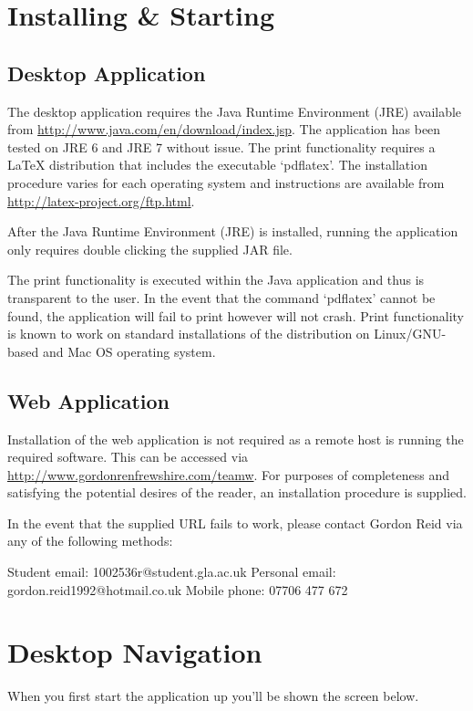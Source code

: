 \section{Installing \& Starting}
\subsection{Desktop Application}

The desktop application requires the Java Runtime Environment (JRE) available from \url{http://www.java.com/en/download/index.jsp}. The application has been tested on JRE 6 and JRE 7 without issue. The print functionality requires a LaTeX distribution that includes the executable `pdflatex'. The installation procedure varies for each operating system and instructions are available from \url{http://latex-project.org/ftp.html}.

After the Java Runtime Environment (JRE) is installed, running the application only requires double clicking the supplied JAR file.

The print functionality is executed within the Java application and thus is transparent to the user. In the event that the command `pdflatex' cannot be found, the application will fail to print however will not crash. Print functionality is known to work on standard installations of the distribution on Linux/GNU-based and Mac OS operating system.

\subsection{Web Application}

Installation of the web application is not required as a remote host is running the required software. This can be accessed via \url{http://www.gordonrenfrewshire.com/teamw}. For purposes of completeness and satisfying the potential desires of the reader, an installation procedure is supplied.

In the event that the supplied URL fails to work, please contact Gordon Reid via any of the following methods:

Student email: 1002536r@student.gla.ac.uk
Personal email: gordon.reid1992@hotmail.co.uk
Mobile phone: 07706 477 672

\section{Desktop Navigation}

When you first start the application up you'll be shown the screen below.

